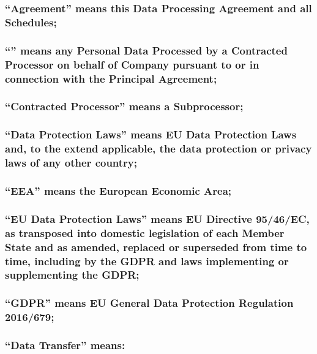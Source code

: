 \documentclass[a4paper]{article}
\begin{document}
\subsubsection{\textbf{``Agreement''} means this Data Processing Agreement and all Schedules;}

\subsubsection{\textbf{``''} means any Personal Data Processed by a Contracted Processor on behalf of Company pursuant to or in connection with the Principal Agreement;}

\subsubsection{\textbf{``Contracted Processor''} means a Subprocessor;}

\subsubsection{\textbf{``Data Protection Laws''} means EU Data Protection Laws and, to the extend applicable, the data protection or privacy laws of any other country;}

\subsubsection{\textbf{``EEA''} means the European Economic Area;}

\subsubsection{\textbf{``EU Data Protection Laws''} means EU Directive 95/46/EC, as transposed into domestic legislation of each Member State and as amended, replaced or superseded from time to time, including by the GDPR and laws implementing or supplementing the GDPR;}

\subsubsection{\textbf{``GDPR''} means EU General Data Protection Regulation 2016/679;}

\subsubsection{\textbf{``Data Transfer''} means:}
\end{document}
